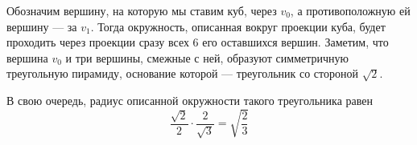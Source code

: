 \begin{itemize}
Обозначим вершину, на которую мы ставим куб, через $v_0$, а противоположную ей вершину — за $v_1$. Тогда окружность, описанная вокруг проекции куба, будет проходить через проекции сразу всех 6 его оставшихся вершин. Заметим, что вершина $v_0$ и три вершины, смежные с ней, образуют симметричную треугольную пирамиду, основание которой — треугольник со стороной $\sqrt{2}$.

В свою очередь, радиус описанной окружности такого треугольника равен
	$$\frac{\sqrt{2}}{2} \cdot \frac{2}{\sqrt{3}} = \sqrt{\frac{2}{3}}$$

\end{itemize}
